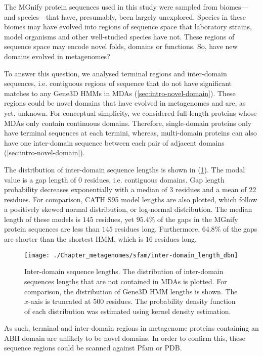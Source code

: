 The MGnify protein sequences used in this study were sampled from biomes---and species---that have, presumably, been largely unexplored. Species in these biomes may have evolved into regions of sequence space that laboratory strains, model organisms and other well-studied species have not. These regions of sequence space may encode novel folds, domains or functions. So, have new domains evolved in metagenomes?

To answer this question, we analysed terminal regions and inter-domain sequences, i.e. contiguous regions of sequence that do not have significant matches to any Gene$3$D HMMs in MDAs (\ref{sec:intro-novel-domain}). These regions could be novel domains that have evolved in metagenomes and are, as yet, unknown. For conceptual simplicity, we considered full-length proteins whose MDAs only contain continuous domains. Therefore, single-domain proteins only have terminal sequences at each termini, whereas, multi-domain proteins can also have one inter-domain sequence between each pair of adjacent domains (\ref{sec:intro-novel-domain}).

The distribution of inter-domain sequence lengths is shown in (\ref{fig:not-matching-domains-gap-length}). The modal value is a gap length of $0$ residues, i.e. contiguous domains. Gap length probability decreases exponentially with a median of $3$ residues and a mean of $22$ residues. For comparison, CATH S95 model lengths are also plotted, which follow a positively skewed normal distribution, or log-normal distribution. The median length of these models is $145$ residues, yet $95.4\%$ of the gaps in the MGnify protein sequences are less than $145$ residues long. Furthermore, $64.8\%$ of the gaps are shorter than the shortest HMM, which is $16$ residues long.

\begin{figure}[!hbt]
    \centering
    \texttt{[image: ./Chapter\_metagenomes/sfam/inter-domain\_length\_dbn]}
    \caption{%
        Inter-domain sequence lengths.
        The distribution of inter-domain sequences lengths that are not contained in MDAs is plotted.
        For comparison, the distribution of Gene$3$D HMM lengths is shown.
        The $x$-axis is truncated at 500 residues.
        The probability density function of each distribution was estimated using kernel density estimation.
    }
    \label{fig:not-matching-domains-gap-length}
\end{figure}

As such, terminal and inter-domain regions in metagenome proteins containing an ABH domain are unlikely to be novel domains. In order to confirm this, these sequence regions could be scanned against Pfam or PDB.

